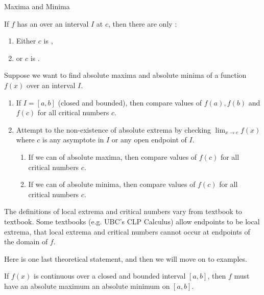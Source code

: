 \documentclass[../main.tex]{subfiles}
\begin{document}
\begin{lesson}{Maxima and Minima}
\begin{mdframed}[style=simple-compact]
    If \(f\) has an  over an interval \(I\) at \(c\), then there are only :
    \begin{enumerate}
      \item Either \(c\) is \underline{\hspace{4in}},
      \item or \(c\) is \underline{\hspace{4in}}.
    \end{enumerate}
  \end{mdframed}

  Suppose we want to find absolute maxima and absolute minima of a function \(f(x)\) over an interval \(I\).
  \begin{enumerate}
    \item If \(I = [a,b]\) (closed and bounded), then compare values of \(f(a), f(b)\) and \(f(c)\) for all critical numbers \(c\).

    \item Attempt to  the non-existence of absolute extrema by checking \(\lim_{x \to c}f(x)\) where \(c\) is any asymptote in \(I\) or any open endpoint of \(I\).
      \begin{enumerate}
        \item If we can  of absolute maxima, then compare values of \(f(c)\) for all critical numbers \(c\).
        \item If we can  of absolute minima, then compare values of \(f(c)\) for all critical numbers \(c\).
      \end{enumerate}
  \end{enumerate}
  \bigskip{}

  \faExclamationTriangle{} The definitions of local extrema and critical numbers vary from textbook to textbook. Some textbooks (e.g. UBC's CLP Calculus) allow endpoints to be local extrema,  that local extrema and critical numbers cannot occur at endpoints of the domain of \(f\).


  \medskip{}
  Here is one last theoretical statement, and then we will move on to examples. 

  \begin{mdframed}[style=withref-compact]
    If \(f(x)\) is continuous over a closed and bounded interval \([a,b]\), then \(f\) must have an absolute maximum  an absolute minimum on \([a,b]\).


\end{mdframed}
\end{lesson}
\end{document}

